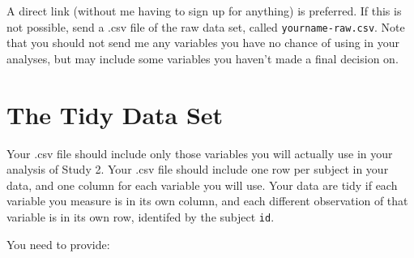 \documentclass[]{book}
\theoremstyle{definition}
\theoremstyle{definition}
\theoremstyle{definition}
\theoremstyle{remark}
\begin{document}
A direct link (without me having to sign up for anything) is preferred.
If this is not possible, send a .csv file of the raw data set, called
\texttt{yourname-raw.csv}. Note that you should not send me any
variables you have no chance of using in your analyses, but may include
some variables you haven't made a final decision on.

\hypertarget{the-tidy-data-set}{%
\section{The Tidy Data Set}\label{the-tidy-data-set}}

Your .csv file should include only those variables you will actually use
in your analysis of Study 2. Your .csv file should include one row per
subject in your data, and one column for each variable you will use.
Your data are tidy if each variable you measure is in its own column,
and each different observation of that variable is in its own row,
identifed by the subject \texttt{id}.

You need to provide:
\end{document}
